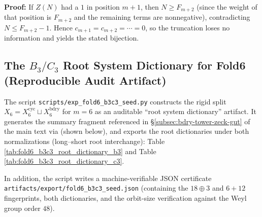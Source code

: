 \textbf{Proof:}
If $Z(N)$ had a $1$ in position $m+1$, then $N\ge F_{m+2}$ (since the weight of that position is $F_{m+2}$ and the remaining terms are nonneg\-ative), contradicting $N\le F_{m+2}-1$. Hence $c_{m+1}=c_{m+2}=\cdots=0$, so the truncation loses no information and yields the stated bijection.

\subsection{The \texorpdfstring{$B_3/C_3$}{B3/C3} Root System Dictionary for Fold6 (Reproducible Audit Artifact)}
\label{app:fold6-b3c3-seed-dictionary}

The script \texttt{scripts/exp\_fold6\_b3c3\_seed.py} constructs the rigid split
\(
X_6=X_6^{\mathrm{cyc}}\sqcup X_6^{\mathrm{bdry}}
\)
for \(m=6\) as an auditable ``root system dictionary'' artifact.
It generates the summary fragment referenced in \S\ref{subsec:bdry-tower-zeck-gut} of the main text via
\verb|| (shown below),
and exports the root dictionaries under both normalizations (long--short root interchange): Table \ref{tab:fold6_b3c3_root_dictionary_b3} and Table \ref{tab:fold6_b3c3_root_dictionary_c3}.






In addition, the script writes a machine-verifiable JSON certificate \texttt{artifacts/export/fold6\_b3c3\_seed.json} (containing the \(18\oplus 3\) and \(6+12\) fingerprints, both dictionaries, and the orbit-size verification against the Weyl group order \(48\)).
